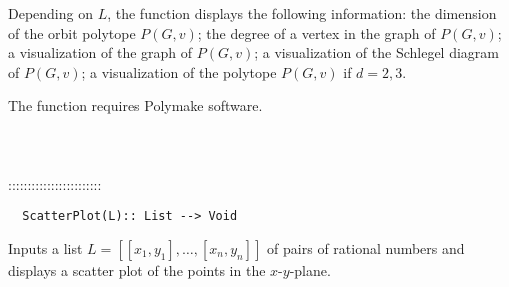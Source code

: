 \documentclass[a4paper,11pt]{report}
\begin{document}
{Depending on $L$, the function displays the following
information:\texttt{}\texttt{} the dimension of the
orbit polytope $P(G,v)$;\texttt{}\texttt{} the degree of a vertex in the graph
of $P(G,v)$;\texttt{}\texttt{} a visualization of the graph of $P(G,v)$;\texttt{}\texttt{} a visualization of the Schlegel
diagram of $P(G,v)$;\texttt{}\texttt{} a visualization of the polytope $P(G,v)$ if $d=2,3$. 

The function requires Polymake software. \\
 \\
 \\
 \\
 ::::::::::::::::::::::::\\
 
\begin{verbatim}  ScatterPlot(L):: List --> Void
\end{verbatim}


 

 Inputs a list $L=[[x_1,y_1],\ldots, [x_n,y_n]]$ of pairs of rational numbers and displays a scatter plot of the points in the $x$-$y$-plane. \\
 \\
 \\
 }

 
\end{document}
